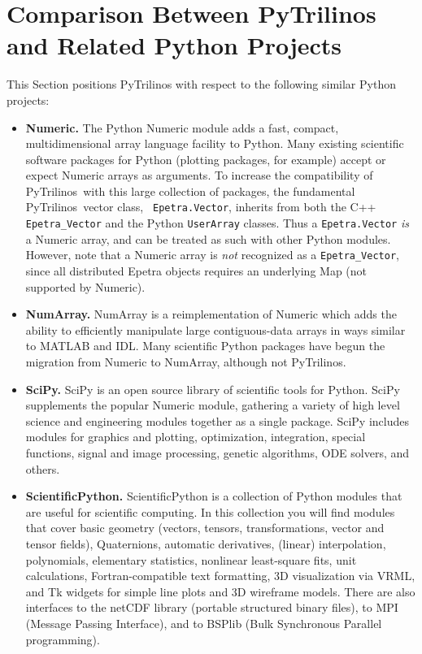 \documentclass[10pt,relax]{SANDreport}
\newcommand{\PyTrilinos}{{PyTrilinos}}
\begin{document}
\section{Comparison Between PyTrilinos and Related Python Projects}
\label{sec:comparison_python}

This Section positions PyTrilinos with respect to the following similar
Python projects:

\begin{itemize}

\item {\bf Numeric.} The Python Numeric module adds a fast, compact,
  multidimensional array language facility to Python.  Many existing
  scientific software packages for Python (plotting packages, for
  example) accept or expect Numeric arrays as arguments.  To increase
  the compatibility of \PyTrilinos\ with this large collection of
  packages, the fundamental \PyTrilinos\ vector class, {\tt
    Epetra.Vector}, inherits from both the C++ {\tt Epetra\_Vector}
  and the Python {\tt UserArray} classes.  Thus a {\tt Epetra.Vector}
  {\sl is} a Numeric array, and can be treated as such with other
  Python modules.  However, note that a Numeric array is {\sl not}
  recognized as a {\tt Epetra\_Vector}, since all distributed Epetra
  objects requires an underlying Map (not supported by Numeric).

\item {\bf NumArray.}  NumArray is a reimplementation of Numeric which
  adds the ability to efficiently manipulate large contiguous-data
  arrays in ways similar to MATLAB and IDL.  Many scientific Python
  packages have begun the migration from Numeric to NumArray, although
  not \PyTrilinos.

\item {\bf SciPy.} SciPy is an open source library of scientific tools
  for Python. SciPy supplements the popular Numeric module, gathering
  a variety of high level science and engineering modules together as
  a single package. SciPy includes modules for graphics and plotting,
  optimization, integration, special functions, signal and image
  processing, genetic algorithms, ODE solvers, and others.

\item {\bf ScientificPython.}  ScientificPython is a collection of
  Python modules that are useful for scientific computing. In this
  collection you will find modules that cover basic geometry (vectors,
  tensors, transformations, vector and tensor fields), Quaternions,
  automatic derivatives, (linear) interpolation, polynomials,
  elementary statistics, nonlinear least-square fits, unit
  calculations, Fortran-compatible text formatting, 3D visualization
  via VRML, and Tk widgets for simple line plots and 3D wireframe
  models. There are also interfaces to the netCDF library (portable
  structured binary files), to MPI (Message Passing Interface), and to
  BSPlib (Bulk Synchronous Parallel programming).


\end{itemize}
\end{document}
